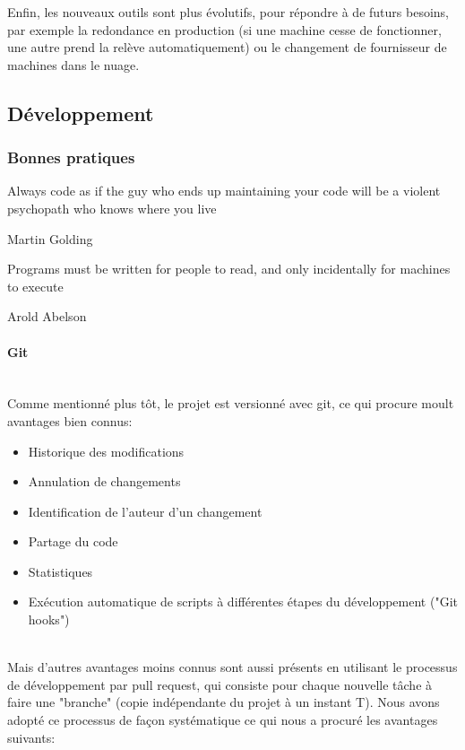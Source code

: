 \documentclass[a4paper,french,12pt]{article}
\begin{document}
		Enfin, les nouveaux outils sont plus évolutifs, pour répondre à de futurs besoins, par exemple la redondance en production (si une machine cesse de fonctionner, une autre prend la relève automatiquement) ou le changement de fournisseur de machines dans le nuage.


	\subsection{Développement}

	  \subsubsection{Bonnes pratiques}
	    \epigraph{Always code as if the guy who ends up maintaining your code will be a violent psychopath who knows where you live}{Martin Golding}
	    \epigraph{Programs must be written for people to read, and only incidentally for machines to execute}{Arold Abelson}

	\paragraph{Git}~\\	
	    Comme mentionné plus tôt, le projet est versionné avec git, ce qui procure moult avantages bien connus:~\\
	    
	    \begin{itemize}
	    	\item Historique des modifications
	    	\item Annulation de changements
	    	\item Identification de l'auteur d'un changement
	    	\item Partage du code
	    	\item Statistiques
	    	\item Exécution automatique de scripts à différentes étapes du développement ("Git hooks")
	    \end{itemize}~\\
	    
 Mais d'autres avantages moins connus sont aussi présents en utilisant le processus de développement par pull request, qui consiste pour chaque nouvelle tâche à faire une "branche" (copie indépendante du projet à un instant T). Nous avons adopté ce processus de façon systématique ce qui nous a procuré les avantages suivants:~\\
 
\end{document}
